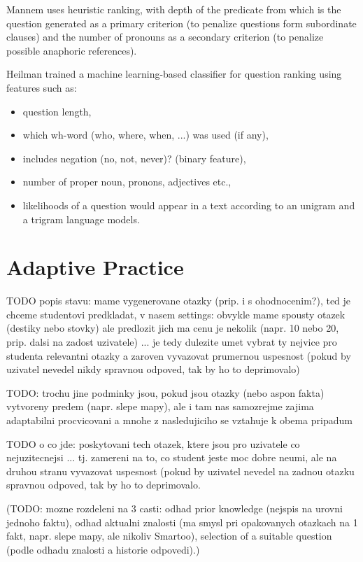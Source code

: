 \documentclass[a4paper, 12pt, twoside]{fithesis2}		%
\renewcommand{\_}{\leavevmode \kern0.07em\vbox{\hrule width0.4em}}
\newcommand{\squarebullet}{\textcolor{black}{\raisebox{0.15em}{\rule{4pt}{4pt}}}}
\newcommand{\emptysquarebullet}{\textcolor{black}{\raisebox{0.10em}{\tiny$\square$}}}
\newenvironment{myItemize}{
  \begin{itemize}[leftmargin=2em,rightmargin=1em,itemsep=\parskip ,parsep=0em,topsep=0em,partopsep=0em]
  \renewcommand{\labelitemi}{\squarebullet}
  \renewcommand{\labelitemii}{\textbullet}
}{
  \end{itemize}
}
\begin{document}
Mannem \cite{question-gen-mannem} uses heuristic ranking,
with depth of the predicate from which is the question generated as a primary criterion
(to penalize questions form subordinate clauses)
and the number of pronouns as a secondary criterion (to penalize possible anaphoric references).

Heilman \cite{question-gen-heilman} trained a machine learning-based classifier for question ranking using features such as:
\begin{myItemize}
\item question length,
\item which wh-word (who, where, when, ...) was used (if any),
\item includes negation (no, not, never)? (binary feature),
\item number of proper noun, pronons, adjectives etc.,
\item likelihoods of a question would appear in a text according to an unigram and a trigram language models.
\end{myItemize}


\chapter{Adaptive Practice}
\label{chap:practice}

TODO popis stavu: mame vygenerovane otazky (prip. i s ohodnocenim?), ted je chceme studentovi predkladat, v nasem settings: obvykle mame spousty otazek (destiky nebo stovky) ale predlozit jich ma cenu je nekolik (napr. 10 nebo 20, prip. dalsi na zadost uzivatele) ... je tedy dulezite umet vybrat ty nejvice pro studenta relevantni otazky a zaroven vyvazovat prumernou uspesnost (pokud by uzivatel nevedel nikdy spravnou odpoved, tak by ho to deprimovalo)

TODO: trochu jine podminky jsou, pokud jsou otazky (nebo aspon fakta) vytvoreny predem (napr. slepe mapy), ale i tam nas samozrejme zajima adaptabilni procvicovani a mnohe z nasledujiciho se vztahuje k obema pripadum

TODO o co jde: poskytovani tech otazek, ktere jsou pro uzivatele co nejuzitecnejsi ... tj. zamereni na to, co student jeste moc dobre neumi, ale na druhou stranu vyvazovat uspesnost (pokud by uzivatel nevedel na zadnou otazku spravnou odpoved, tak by ho to deprimovalo.

(TODO: mozne rozdeleni na 3 casti: odhad prior knowledge (nejspis na urovni jednoho faktu), odhad aktualni znalosti (ma smysl pri opakovanych otazkach na 1 fakt, napr. slepe mapy, ale nikoliv Smartoo), selection of a suitable question (podle odhadu znalosti a historie odpovedi).)
\end{document}
